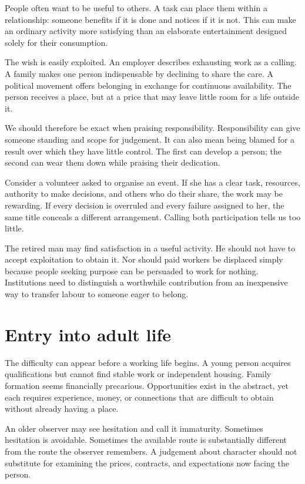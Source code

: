 \documentclass[12pt,a4paper]{book}
\begin{document}
People often want to be useful to others. A task can place them within a relationship: someone benefits if it is done and notices if it is not. This can make an ordinary activity more satisfying than an elaborate entertainment designed solely for their consumption.

The wish is easily exploited. An employer describes exhausting work as a calling. A family makes one person indispensable by declining to share the care. A political movement offers belonging in exchange for continuous availability. The person receives a place, but at a price that may leave little room for a life outside it.

We should therefore be exact when praising responsibility. Responsibility can give someone standing and scope for judgement. It can also mean being blamed for a result over which they have little control. The first can develop a person; the second can wear them down while praising their dedication.

Consider a volunteer asked to organise an event. If she has a clear task, resources, authority to make decisions, and others who do their share, the work may be rewarding. If every decision is overruled and every failure assigned to her, the same title conceals a different arrangement. Calling both participation tells us too little.

The retired man may find satisfaction in a useful activity. He should not have to accept exploitation to obtain it. Nor should paid workers be displaced simply because people seeking purpose can be persuaded to work for nothing. Institutions need to distinguish a worthwhile contribution from an inexpensive way to transfer labour to someone eager to belong.

\section*{Entry into adult life}

The difficulty can appear before a working life begins. A young person acquires qualifications but cannot find stable work or independent housing. Family formation seems financially precarious. Opportunities exist in the abstract, yet each requires experience, money, or connections that are difficult to obtain without already having a place.

An older observer may see hesitation and call it immaturity. Sometimes hesitation is avoidable. Sometimes the available route is substantially different from the route the observer remembers. A judgement about character should not substitute for examining the prices, contracts, and expectations now facing the person.
\end{document}
